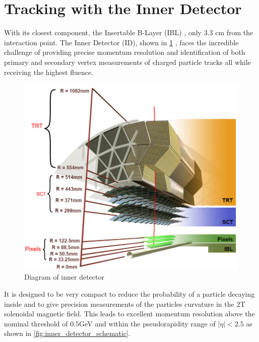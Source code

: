 \section{Tracking with the Inner Detector} \label{sec:atlas:tracking}

With its closest component, the Insertable B-Layer (IBL)
\cite{Potamianos:2209070}, only 3.3 cm from the interaction point. The Inner
Detector (ID), shown in \cref{fig:inner_detector_diagram}
\cite{ATLAS-TDR-4,ATLAS-TDR-5}, faces the incredible challenge of providing
precise momentum resolution and identification of both primary and secondary
vertex measurements of charged particle tracks all while receiving the highest fluence.

\begin{figure}[!htbp]
  \begin{center}
    \includegraphics[width=0.8\linewidth]{figures/atlas/inner_detector_diagram}
    \caption{ \cite{Potamianos:2209070} Diagram of inner detector}
    \label{fig:inner_detector_diagram}
  \end{center}
\end{figure}

It is designed to be very compact to reduce the probability of a particle
decaying inside and to give precision measurements of the particles curvature in
the 2T solenoidal magnetic field. This leads to excellent momentum resolution
above the nominal \pT threshold of $0.5$GeV and within the pseudorapidity range
of $|\eta| < 2.5$ as shown in \cref{fig:inner_detector_schematic}.

